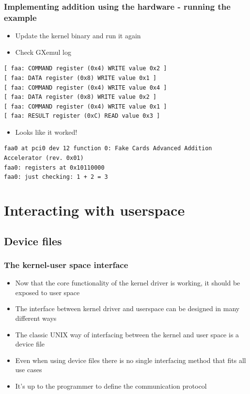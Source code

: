 \documentclass[dvipsnames,table]{beamer}
\begin{document}
\begin{frame}[fragile]
\frametitle{Implementing addition using the hardware - running the example}
\begin{itemize}
	\item Update the kernel binary and run it again
	\item Check GXemul log
\end{itemize}
\begin{verbatim}
[ faa: COMMAND register (0x4) WRITE value 0x2 ]
[ faa: DATA register (0x8) WRITE value 0x1 ]
[ faa: COMMAND register (0x4) WRITE value 0x4 ]
[ faa: DATA register (0x8) WRITE value 0x2 ]
[ faa: COMMAND register (0x4) WRITE value 0x1 ]
[ faa: RESULT register (0xC) READ value 0x3 ]
\end{verbatim}
\begin{itemize}
	\item Looks like it worked!
\end{itemize}
\tiny
\begin{verbatim}
faa0 at pci0 dev 12 function 0: Fake Cards Advanced Addition Accelerator (rev. 0x01)
faa0: registers at 0x10110000
faa0: just checking: 1 + 2 = 3
\end{verbatim}
\end{frame}


\section{Interacting with userspace}

\subsection{Device files}

\begin{frame}
\frametitle{The kernel-user space interface}
\begin{itemize}
	\item Now that the core functionality of the kernel driver is working, it should be exposed to user space
	\item The interface between kernel driver and userspace can be designed in many different ways
	\item The classic UNIX way of interfacing between the kernel and user space is a device file
	\item Even when using device files there is no single interfacing method that fits all use cases
	\item It's up to the programmer to define the communication protocol
\end{itemize}
\end{frame}
\end{document}

